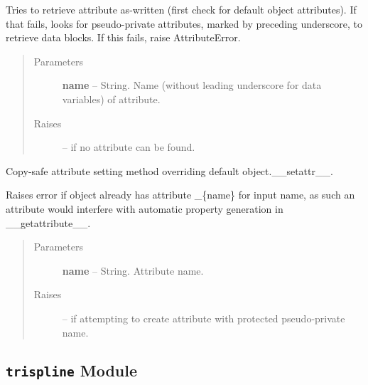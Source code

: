 \documentclass[letterpaper,10pt,english]{sphinxmanual}
\begin{document}
\begin{fulllineitems}
\begin{fulllineitems}
Tries to retrieve attribute as-written (first check for default object attributes).
If that fails, looks for pseudo-private attributes, marked by preceding underscore,
to retrieve data blocks.  If this fails, raise AttributeError.
\begin{quote}\begin{description}
\item[{Parameters }] \leavevmode
\textbf{name} --
String.
Name (without leading underscore for data variables) of attribute.

\item[{Raises }] \leavevmode
{} -- 
if no attribute can be found.

\end{description}\end{quote}

\end{fulllineitems}


\begin{fulllineitems}
\label{eqtools:eqtools.pfilereader.PFileReader.__setattr__}
Copy-safe attribute setting method overriding default object.\_\_setattr\_\_.

Raises error if object already has attribute \_\{name\} for input name,
as such an attribute would interfere with automatic property generation in
\_\_getattribute\_\_.
\begin{quote}\begin{description}
\item[{Parameters }] \leavevmode
\textbf{name} --
String.
Attribute name.

\item[{Raises }] \leavevmode
{} -- 
if attempting to create attribute with protected
pseudo-private name.

\end{description}\end{quote}

\end{fulllineitems}


\end{fulllineitems}



\subsection{\texttt{trispline} Module}
\label{eqtools:trispline-module}
\end{document}

